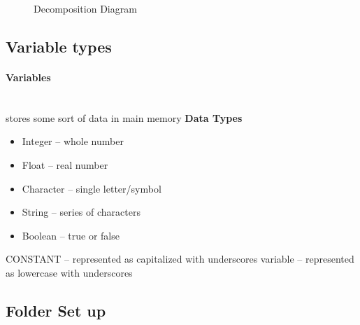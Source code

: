 \documentclass{article}
\newcommand{\myparagraph}[1]{\paragraph{#1}\mbox{}\\} %
\begin{document}
\begin{landscape}
\begin{figure}[p]
\caption{Decomposition Diagram}
\label{decomp}
\end{figure}
\end{landscape}

\subsection{Variable types}   

\myparagraph{Variables}
stores some sort of data in main memory \linebreak \textbf{Data Types}
\begin{itemize}
\item Integer – whole number   
\item Float – real number   
\item Character – single letter/symbol   
\item String – series of characters   
\item Boolean – true or false   
\end{itemize}

CONSTANT – represented as capitalized with underscores
\linebreak
variable – represented as lowercase with underscores 

\subsection{Folder Set up}
\end{document}
